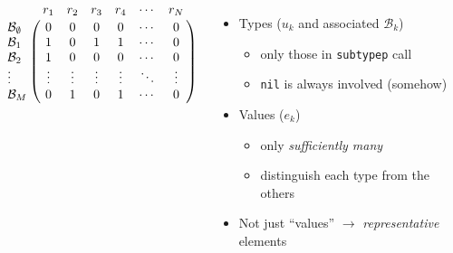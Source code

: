 \documentclass[aspectratio=169]{beamer}
\renewcommand\code[1]{\texttt{#1}}
\newcommand\rarr{\ensuremath{\rightarrow}}
\begin{document}
\begin{frame}
\begin{columns}
\begin{overprint}
      \[
        \bordermatrix{
          &r_1   &r_2   &r_3   &r_4   &\cdots&r_N \cr
          \mathcal B_\emptyset &0     &0     &0     &0     &\cdots&0\cr
          \mathcal B_1     &1     &0     &1     &1     &\cdots&0\cr
          \mathcal B_2     &1     &0     &0     &0     &\cdots&0\cr
          \vdots  &\vdots&\vdots&\vdots&\vdots&\ddots&\vdots\cr
          \mathcal B_M&0     &1     &0     &1     &\cdots&0\cr
        }
      \]
    \end{overprint}
    \begin{itemize}
    \item<2-> Types ($u_k$ and associated $\mathcal B_k$)
      \begin{itemize}
      \item only those in \code{subtypep} call
      \item \code{nil} is always involved (somehow)
      \end{itemize}
    \item<3-> Values ($e_k$)
      \begin{itemize}
      \item only \emph{sufficiently many}
      \item distinguish each type from the others
      \end{itemize}
    \item<4-> Not just ``values'' \rarr{} \emph{representative} elements
    \end{itemize}
  \end{columns}
\end{frame}
\end{document}
